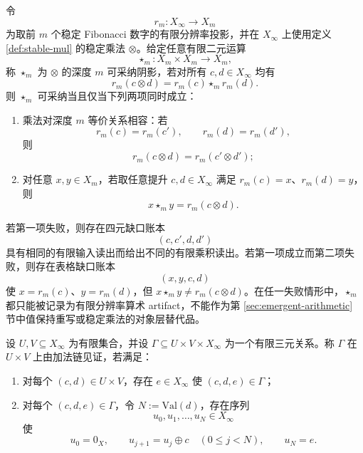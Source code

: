\begin{theorem}[有限乘法表的细化相容性判别]\label{distill:cech_cohomology-refinement_stability_separation-ea-finite-multiplication-shadow-criterion}
令
\[
r_m:X_\infty\longrightarrow X_m
\]
为取前 \(m\) 个稳定 Fibonacci 数字的有限分辨率投影，并在 \(X_\infty\) 上使用定义 \ref{def:stable-mul} 的稳定乘法 \(\otimes\)。给定任意有限二元运算
\[
\star_m:X_m\times X_m\longrightarrow X_m,
\]
称 \(\star_m\) 为 \(\otimes\) 的深度 \(m\) 可采纳阴影，若对所有 \(c,d\in X_\infty\) 均有
\[
r_m(c\otimes d)=r_m(c)\star_m r_m(d).
\]
则 \(\star_m\) 可采纳当且仅当下列两项同时成立：
\begin{enumerate}
  \item 乘法对深度 \(m\) 等价关系相容：若
  \[
  r_m(c)=r_m(c'),\qquad r_m(d)=r_m(d'),
  \]
  则
  \[
  r_m(c\otimes d)=r_m(c'\otimes d');
  \]
  \item 对任意 \(x,y\in X_m\)，若取任意提升 \(c,d\in X_\infty\) 满足
  \(r_m(c)=x\)、\(r_m(d)=y\)，则
  \[
  x\star_m y=r_m(c\otimes d).
  \]
\end{enumerate}
若第一项失败，则存在四元缺口账本
\[
(c,c',d,d')
\]
具有相同的有限输入读出而给出不同的有限乘积读出。若第一项成立而第二项失败，则存在表格缺口账本
\[
(x,y,c,d)
\]
使 \(x=r_m(c)\)、\(y=r_m(d)\)，但 \(x\star_m y\ne r_m(c\otimes d)\)。在任一失败情形中，\(\star_m\) 都只能被记录为有限分辨率算术 artifact，不能作为第 \ref{sec:emergent-arithmetic} 节中值保持重写或稳定乘法的对象层替代品。
\end{theorem}
\begin{definition}\label{def:distill-ea-finite-mul-shadow-incidence-witness}
设 \(U,V\subseteq X_\infty\) 为有限集合，并设
\(\Gamma\subseteq U\times V\times X_\infty\) 为一个有限三元关系。称 \(\Gamma\) 在 \(U\times V\) 上由加法链见证，若满足：
\begin{enumerate}
  \item 对每个 \((c,d)\in U\times V\)，存在 \(e\in X_\infty\) 使 \((c,d,e)\in\Gamma\)；
  \item 对每个 \((c,d,e)\in\Gamma\)，令 \(N:=\mathrm{Val}(d)\)，存在序列
  \[
  u_0,u_1,\ldots,u_N\in X_\infty
  \]
  使
  \[
  u_0=0_X,\qquad u_{j+1}=u_j\oplus c\quad(0\le j<N),\qquad u_N=e.
  \]
\end{enumerate}
\end{definition}

